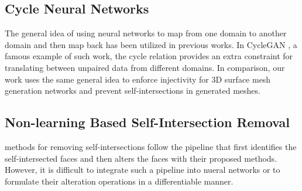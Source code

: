 \subsection{Cycle Neural Networks}
The general idea of using neural networks to map from one domain to another domain and then map back has been utilized in previous works. In CycleGAN \cite{CycleGAN2017}, a famous example of such work, the cycle relation provides an extra constraint for translating between unpaired data from different domains. In comparison, our work uses the same general idea to enforce injectivity for 3D surface mesh generation networks and prevent self-intersections in generated meshes. 

\subsection{Non-learning Based Self-Intersection Removal}
 methods  for removing self-intersections follow the pipeline that first identifies the self-intersected faces and then alters the faces with their proposed methods. However, it is difficult to integrate such a pipeline into nueral networks or to formulate their alteration operations in a differentiable manner. 

